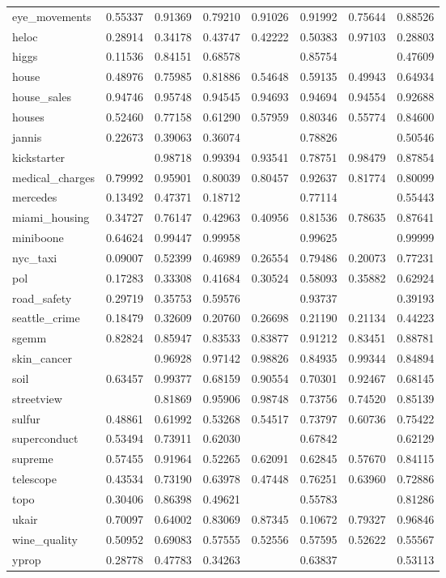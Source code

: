 \begin{tabular}{lrrrrrrr}
eye_movements & 0.55337 & 0.91369 & 0.79210 & 0.91026 & 0.91992 & 0.75644 & 0.88526 \\
heloc & 0.28914 & 0.34178 & 0.43747 & 0.42222 & 0.50383 & 0.97103 & 0.28803 \\
higgs & 0.11536 & 0.84151 & 0.68578 &  & 0.85754 &  & 0.47609 \\
house & 0.48976 & 0.75985 & 0.81886 & 0.54648 & 0.59135 & 0.49943 & 0.64934 \\
house_sales & 0.94746 & 0.95748 & 0.94545 & 0.94693 & 0.94694 & 0.94554 & 0.92688 \\
houses & 0.52460 & 0.77158 & 0.61290 & 0.57959 & 0.80346 & 0.55774 & 0.84600 \\
jannis & 0.22673 & 0.39063 & 0.36074 &  & 0.78826 &  & 0.50546 \\
kickstarter &  & 0.98718 & 0.99394 & 0.93541 & 0.78751 & 0.98479 & 0.87854 \\
medical_charges & 0.79992 & 0.95901 & 0.80039 & 0.80457 & 0.92637 & 0.81774 & 0.80099 \\
mercedes & 0.13492 & 0.47371 & 0.18712 &  & 0.77114 &  & 0.55443 \\
miami_housing & 0.34727 & 0.76147 & 0.42963 & 0.40956 & 0.81536 & 0.78635 & 0.87641 \\
miniboone & 0.64624 & 0.99447 & 0.99958 &  & 0.99625 &  & 0.99999 \\
nyc_taxi & 0.09007 & 0.52399 & 0.46989 & 0.26554 & 0.79486 & 0.20073 & 0.77231 \\
pol & 0.17283 & 0.33308 & 0.41684 & 0.30524 & 0.58093 & 0.35882 & 0.62924 \\
road_safety & 0.29719 & 0.35753 & 0.59576 &  & 0.93737 &  & 0.39193 \\
seattle_crime & 0.18479 & 0.32609 & 0.20760 & 0.26698 & 0.21190 & 0.21134 & 0.44223 \\
sgemm & 0.82824 & 0.85947 & 0.83533 & 0.83877 & 0.91212 & 0.83451 & 0.88781 \\
skin_cancer &  & 0.96928 & 0.97142 & 0.98826 & 0.84935 & 0.99344 & 0.84894 \\
soil & 0.63457 & 0.99377 & 0.68159 & 0.90554 & 0.70301 & 0.92467 & 0.68145 \\
streetview &  & 0.81869 & 0.95906 & 0.98748 & 0.73756 & 0.74520 & 0.85139 \\
sulfur & 0.48861 & 0.61992 & 0.53268 & 0.54517 & 0.73797 & 0.60736 & 0.75422 \\
superconduct & 0.53494 & 0.73911 & 0.62030 &  & 0.67842 &  & 0.62129 \\
supreme & 0.57455 & 0.91964 & 0.52265 & 0.62091 & 0.62845 & 0.57670 & 0.84115 \\
telescope & 0.43534 & 0.73190 & 0.63978 & 0.47448 & 0.76251 & 0.63960 & 0.72886 \\
topo & 0.30406 & 0.86398 & 0.49621 &  & 0.55783 &  & 0.81286 \\
ukair & 0.70097 & 0.64002 & 0.83069 & 0.87345 & 0.10672 & 0.79327 & 0.96846 \\
wine_quality & 0.50952 & 0.69083 & 0.57555 & 0.52556 & 0.57595 & 0.52622 & 0.55567 \\
yprop & 0.28778 & 0.47783 & 0.34263 &  & 0.63837 &  & 0.53113 \\
\bottomrule
\end{tabular}
